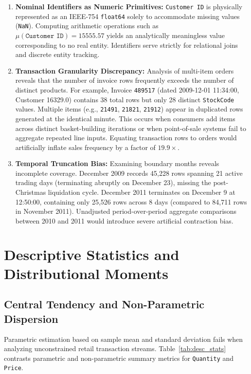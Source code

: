 \documentclass[journal,10pt,twocolumn]{IEEEtran}
\begin{document}
\begin{enumerate}
    \item \textbf{Nominal Identifiers as Numeric Primitives:} \texttt{Customer ID} is physically represented as an IEEE-754 \texttt{float64} solely to accommodate missing values (\texttt{NaN}). Computing arithmetic operations such as $\mu(\texttt{Customer ID}) = 15555.57$ yields an analytically meaningless value corresponding to no real entity. Identifiers serve strictly for relational joins and discrete entity tracking.
    \item \textbf{Transaction Granularity Discrepancy:} Analysis of multi-item orders reveals that the number of invoice rows frequently exceeds the number of distinct products. For example, Invoice \texttt{489517} (dated 2009-12-01 11:34:00, Customer 16329.0) contains 38 total rows but only 28 distinct \texttt{StockCode} values. Multiple items (e.g., \texttt{21491}, \texttt{21821}, \texttt{21912}) appear in duplicated rows generated at the identical minute. This occurs when consumers add items across distinct basket-building iterations or when point-of-sale systems fail to aggregate repeated line inputs. Equating transaction rows to orders would artificially inflate sales frequency by a factor of $19.9\times$.
    \item \textbf{Temporal Truncation Bias:} Examining boundary months reveals incomplete coverage. December 2009 records 45,228 rows spanning 21 active trading days (terminating abruptly on December 23), missing the post-Christmas liquidation cycle. December 2011 terminates on December 9 at 12:50:00, containing only 25,526 rows across 8 days (compared to 84,711 rows in November 2011). Unadjusted period-over-period aggregate comparisons between 2010 and 2011 would introduce severe artificial contraction bias.
\end{enumerate}

\section{Descriptive Statistics and Distributional Moments}

\subsection{Central Tendency and Non-Parametric Dispersion}
Parametric estimation based on sample mean and standard deviation fails when analyzing unconstrained retail transaction streams. Table~\ref{tab:desc_stats} contrasts parametric and non-parametric summary metrics for \texttt{Quantity} and \texttt{Price}.
\end{document}
